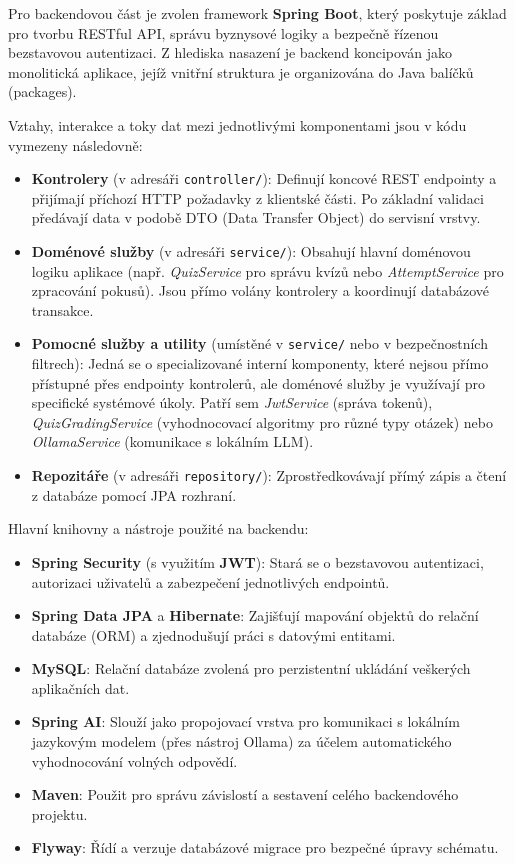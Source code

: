 \documentclass{vskpou} %
\begin{document}
Pro backendovou část je zvolen framework \textbf{Spring Boot}\cite{spring_boot}, který poskytuje základ pro tvorbu RESTful API, správu byznysové logiky a bezpečně řízenou bezstavovou autentizaci. Z hlediska nasazení je backend koncipován jako monolitická aplikace, jejíž vnitřní struktura je organizována do Java balíčků (packages).

Vztahy, interakce a toky dat mezi jednotlivými komponentami jsou v kódu vymezeny následovně:
\begin{itemize}
    \item \textbf{Kontrolery} (v adresáři \texttt{controller/}): Definují koncové REST endpointy a přijímají příchozí HTTP požadavky z klientské části. Po základní validaci předávají data v podobě DTO (Data Transfer Object) do servisní vrstvy.
    \item \textbf{Doménové služby} (v adresáři \texttt{service/}): Obsahují hlavní doménovou logiku aplikace (např. \textit{QuizService} pro správu kvízů nebo \textit{AttemptService} pro zpracování pokusů). Jsou přímo volány kontrolery a koordinují databázové transakce.
    \item \textbf{Pomocné služby a utility} (umístěné v \texttt{service/} nebo v bezpečnostních filtrech): Jedná se o specializované interní komponenty, které nejsou přímo přístupné přes endpointy kontrolerů, ale doménové služby je využívají pro specifické systémové úkoly. Patří sem \textit{JwtService} (správa tokenů), \textit{QuizGradingService} (vyhodnocovací algoritmy pro různé typy otázek) nebo \textit{OllamaService} (komunikace s lokálním LLM).
    \item \textbf{Repozitáře} (v adresáři \texttt{repository/}): Zprostředkovávají přímý zápis a čtení z databáze pomocí JPA rozhraní.
\end{itemize}

Hlavní knihovny a nástroje použité na backendu:
\begin{itemize}
    \item \textbf{Spring Security} (s využitím \textbf{JWT}): Stará se o bezstavovou autentizaci, autorizaci uživatelů a zabezpečení jednotlivých endpointů.
    \item \textbf{Spring Data JPA} a \textbf{Hibernate}: Zajišťují mapování objektů do relační databáze (ORM) a zjednodušují práci s datovými entitami.
    \item \textbf{MySQL}: Relační databáze zvolená pro perzistentní ukládání veškerých aplikačních dat.
    \item \textbf{Spring AI}\cite{spring_ai_llm, spring_ai_tracing}: Slouží jako propojovací vrstva pro komunikaci s lokálním jazykovým modelem (přes nástroj Ollama) za účelem automatického vyhodnocování volných odpovědí.
    \item \textbf{Maven}\cite{maven_cookbook}: Použit pro správu závislostí a sestavení celého backendového projektu.
    \item \textbf{Flyway}\cite{flyway_baeldung}: Řídí a verzuje databázové migrace pro bezpečné úpravy schématu.
\end{itemize}
\end{document}
